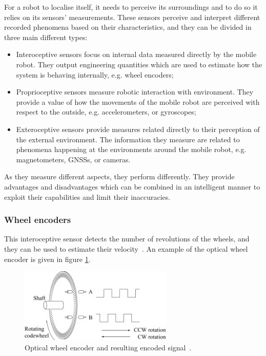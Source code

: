 \noindent For a robot to localise itself, it needs to perceive its surroundings and to do so it relies on its sensors' measurements.
These sensors perceive and interpret different recorded phenomena based on their characteristics, and they can be divided in three main different types:
\begin{itemize}
    \item Interoceptive sensors focus on internal data measured directly by the mobile robot. They output engineering quantities which are used to estimate how the system is behaving internally, e.g. wheel encoders;
    \item Proprioceptive sensors measure robotic interaction with environment. They provide a value of how the movements of the mobile robot are perceived with respect to the outside, e.g. accelerometers, or gyroscopes;
    \item Exteroceptive sensors provide measures related directly to their perception of the external environment. The information they measure are related to phenomena happening at the environments around the mobile robot, e.g. magnetometers, \glspl{GNSS}, or cameras.
\end{itemize}

As they measure different aspects, they perform differently.
They provide advantages and disadvantages which can be combined in an intelligent manner to exploit their capabilities and limit their inaccuracies.

\subsubsection{Wheel encoders}

\noindent This interoceptive sensor detects the number of revolutions of the wheels, and they can be used to estimate their velocity~\cite{encoder}. An example of the optical wheel encoder is given in figure \ref{fig:encoder}.
\begin{figure}[!ht]
  \begin{center}
    \includegraphics[width=0.65\textwidth]{Images/2-Background/Enc.jpg}
  \end{center}
  \caption{Optical wheel encoder and resulting encoded signal~\cite{wheelEncoder}.}
  \label{fig:encoder}
\end{figure}

